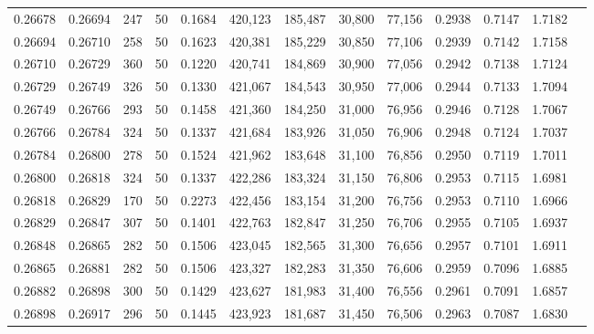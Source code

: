 \begin{tabular}{rrrrrrrrrrrrr}
0.26678 & 0.26694 &   247 &  50 &                                     0.1684 & 420,123 & 185,487 &  30,800 &  77,156 & 0.2938 & 0.7147 & 1.7182 \\
0.26694 & 0.26710 &   258 &  50 &                                     0.1623 & 420,381 & 185,229 &  30,850 &  77,106 & 0.2939 & 0.7142 & 1.7158 \\
0.26710 & 0.26729 &   360 &  50 &                                     0.1220 & 420,741 & 184,869 &  30,900 &  77,056 & 0.2942 & 0.7138 & 1.7124 \\
0.26729 & 0.26749 &   326 &  50 &                                     0.1330 & 421,067 & 184,543 &  30,950 &  77,006 & 0.2944 & 0.7133 & 1.7094 \\
0.26749 & 0.26766 &   293 &  50 &                                     0.1458 & 421,360 & 184,250 &  31,000 &  76,956 & 0.2946 & 0.7128 & 1.7067 \\
0.26766 & 0.26784 &   324 &  50 &                                     0.1337 & 421,684 & 183,926 &  31,050 &  76,906 & 0.2948 & 0.7124 & 1.7037 \\
0.26784 & 0.26800 &   278 &  50 &                                     0.1524 & 421,962 & 183,648 &  31,100 &  76,856 & 0.2950 & 0.7119 & 1.7011 \\
0.26800 & 0.26818 &   324 &  50 &                                     0.1337 & 422,286 & 183,324 &  31,150 &  76,806 & 0.2953 & 0.7115 & 1.6981 \\
0.26818 & 0.26829 &   170 &  50 &                                     0.2273 & 422,456 & 183,154 &  31,200 &  76,756 & 0.2953 & 0.7110 & 1.6966 \\
0.26829 & 0.26847 &   307 &  50 &                                     0.1401 & 422,763 & 182,847 &  31,250 &  76,706 & 0.2955 & 0.7105 & 1.6937 \\
0.26848 & 0.26865 &   282 &  50 &                                     0.1506 & 423,045 & 182,565 &  31,300 &  76,656 & 0.2957 & 0.7101 & 1.6911 \\
0.26865 & 0.26881 &   282 &  50 &                                     0.1506 & 423,327 & 182,283 &  31,350 &  76,606 & 0.2959 & 0.7096 & 1.6885 \\
0.26882 & 0.26898 &   300 &  50 &                                     0.1429 & 423,627 & 181,983 &  31,400 &  76,556 & 0.2961 & 0.7091 & 1.6857 \\
0.26898 & 0.26917 &   296 &  50 &                                     0.1445 & 423,923 & 181,687 &  31,450 &  76,506 & 0.2963 & 0.7087 & 1.6830 \\

\end{tabular}
